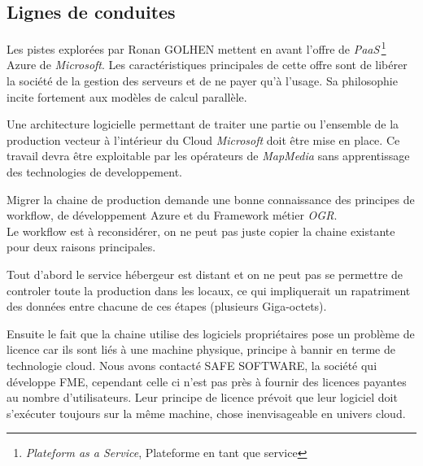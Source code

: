 %
%

\subsection{Lignes de conduites}

Les pistes explorées par Ronan GOLHEN mettent en avant l'offre de
\textit{PaaS}\,\footnote{\textit{Plateform as a Service}, Plateforme
  en tant que service} Azure de \textit{Microsoft}. Les
caractéristiques principales de cette offre sont de libérer la société
de la gestion des serveurs et de ne payer qu'à l'usage. Sa philosophie
incite fortement aux modèles de calcul parallèle. 


Une architecture logicielle permettant de traiter une partie ou
l'ensemble de la production vecteur à l'intérieur du Cloud
\textit{Microsoft} doit être mise en place. Ce travail devra être
exploitable par les opérateurs de \textit{MapMedia} sans apprentissage
des technologies de developpement.


Migrer la chaine de production demande une bonne connaissance des
principes de workflow, de développement Azure et du Framework métier
\textit{OGR}.\\

 Le workflow est à reconsidérer, on ne peut pas juste copier la chaine
 existante pour deux raisons principales.

Tout d'abord le service hébergeur est distant et on ne peut pas se
permettre de controler toute la production dans les locaux, ce qui
impliquerait un rapatriment des données entre chacune de ces étapes
(plusieurs Giga-octets). 

Ensuite le fait que la chaine utilise des logiciels propriétaires pose
un problème de licence car ils sont liés à une machine physique,
principe à bannir en terme de technologie cloud.  Nous avons contacté
SAFE SOFTWARE, la société qui développe FME, cependant celle ci n'est
pas près à fournir des licences payantes au nombre
d'utilisateurs. Leur principe de licence prévoit que leur logiciel
doit s'exécuter toujours sur la même machine, chose inenvisageable en
univers cloud.\\


